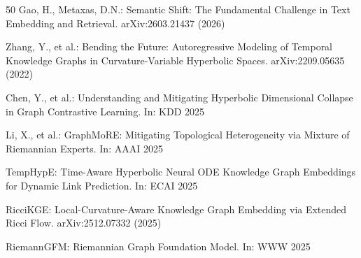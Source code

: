 \documentclass[hf]{ceurart}
\begin{document}
\begin{thebibliography}{50}
Gao, H., Metaxas, D.N.: Semantic Shift: The Fundamental Challenge in
Text Embedding and Retrieval. arXiv:2603.21437 (2026)

Zhang, Y., et al.: Bending the Future: Autoregressive Modeling of
Temporal Knowledge Graphs in Curvature-Variable Hyperbolic Spaces.
arXiv:2209.05635 (2022)

Chen, Y., et al.: Understanding and Mitigating Hyperbolic Dimensional
Collapse in Graph Contrastive Learning. In: KDD 2025

Li, X., et al.: GraphMoRE: Mitigating Topological Heterogeneity via
Mixture of Riemannian Experts. In: AAAI 2025

TempHypE: Time-Aware Hyperbolic Neural ODE Knowledge Graph
Embeddings for Dynamic Link Prediction. In: ECAI 2025

RicciKGE: Local-Curvature-Aware Knowledge Graph Embedding via
Extended Ricci Flow. arXiv:2512.07332 (2025)

RiemannGFM: Riemannian Graph Foundation Model. In: WWW 2025

\end{thebibliography}
\end{document}
